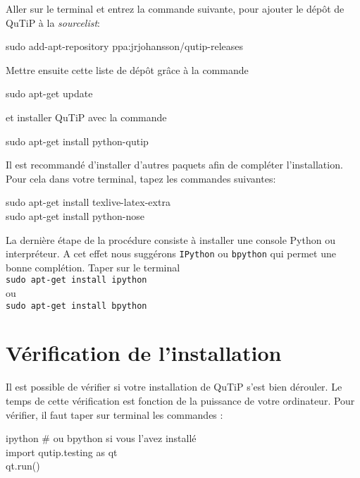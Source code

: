 Aller sur le terminal et entrez la commande suivante, pour ajouter le dépôt 
de QuTiP à la \emph{sourcelist}:\\
\begin{tt}
sudo add-apt-repository ppa:jrjohansson/qutip-releases\\
\end{tt}
Mettre ensuite cette liste de dépôt grâce à la commande\\
\begin{tt}
sudo apt-get update\\
\end{tt}
et installer QuTiP avec la commande\\
\begin{tt}
sudo apt-get install python-qutip\\
\end{tt}

Il est recommandé d'installer d'autres paquets afin de compléter l'installation. 
Pour cela dans votre terminal, tapez les commandes suivantes:\\
\begin{tt}
sudo apt-get install texlive-latex-extra\\
sudo apt-get install python-nose
\end{tt}

La dernière étape de la procédure consiste à installer une console Python ou 
interpréteur. A cet effet nous suggérons \texttt{IPython} ou \texttt{bpython} 
qui permet une bonne complétion. Taper sur le terminal\\
\texttt{sudo apt-get install ipython}\\
ou\\
\texttt{sudo apt-get install bpython}

\section{Vérification de l'installation}

Il est possible de vérifier si votre installation de QuTiP s'est bien dérouler. 
Le temps de cette vérification est fonction de la puissance de votre ordinateur. 
Pour vérifier, il faut taper sur terminal les commandes :\\
\begin{tt}
ipython \# ou bpython si vous l'avez installé\\
import qutip.testing as qt\\
qt.run()
\end{tt}

